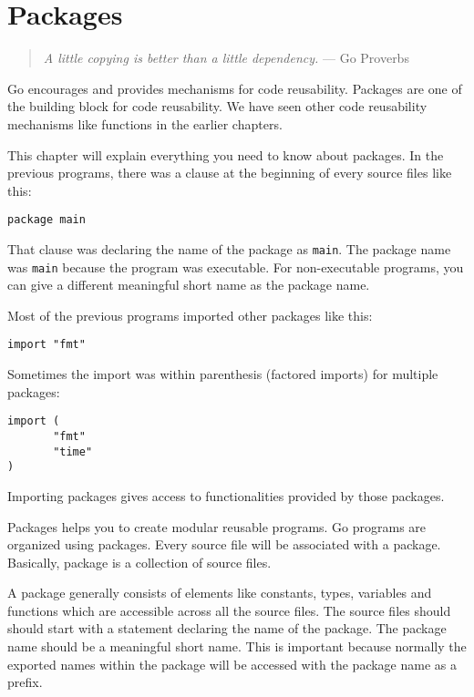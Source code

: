\cleardoublepage
{}
\chapter{Packages}

\begin{quote}
\textit{A little copying is better than a little dependency.} --- Go Proverbs
\end{quote}

Go encourages and provides mechanisms for code reusability.  Packages
are one of the building block for code reusability.  We have seen
other code reusability mechanisms like functions in the earlier
chapters.

This chapter will explain everything you need to know about
packages.  In the previous programs, there was a clause
at the beginning of every source files like this:

\begin{lstlisting}[numbers=none]
package main
\end{lstlisting}

That clause was declaring the name of the package as \texttt{main}.
The package name was \texttt{main} because the program was executable.
For non-executable programs, you can give a different meaningful short
name as the package name.

Most of the previous programs imported other packages like this:

\begin{lstlisting}[numbers=none]
import "fmt"
\end{lstlisting}

Sometimes the import was within parenthesis (factored imports) for
multiple packages:

\begin{lstlisting}[numbers=none]
import (
       "fmt"
       "time"
)
\end{lstlisting}

Importing packages gives access to functionalities provided by those
packages.

Packages helps you to create modular reusable programs.  Go programs
are organized using packages.  Every source file will be associated
with a package.  Basically, package is a collection of source files.

A package generally consists of elements like constants, types,
variables and functions which are accessible across all the source
files.  The source files should should start with a statement
declaring the name of the package.  The package name should be a
meaningful short name.  This is important because normally the
exported names within the package will be accessed with the package
name as a prefix.

